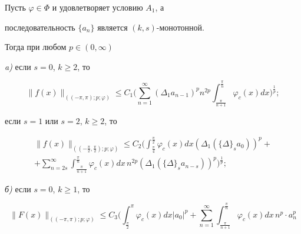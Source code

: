 \begin{assrt}


Пусть $\varphi\in\Phi$ и удовлетворяет условию $A_1$, а


последовательность $\{a_n\}$ является $(k,s)$-монотонной.


Тогда при любом $p\in (0,\infty)$





{\em a)} если $s=0$, $k\geq 2$, то


\begin{equation}


\| f(x)\|_{((-\pi,\pi);p;\varphi)}\leq


C_1\bigg(\sum\limits_{n=1}^{\infty}(\Delta_1a_{n-1})^p n^{2p}


\int_{\frac{\pi}{n+1}}^{\frac{\pi}{n}} \varphi_c(x) dx\bigg)^{\frac{1}{p}};


\end{equation}





если $s=1$ или $s=2$, $k\geq 2$, то


\begin{multline}


\| f(x)\|_{((-\frac{\pi}{2},\frac{\pi}{2});p;\varphi)}\leq


C_2\bigg(\int_{\frac{\pi}{4}}^{\frac{\pi}{2}} \varphi_c(x) dx


(\Delta_1(\{\Delta\}_sa_0))^p+ \\ +


\sum\limits_{n=2s}^{\infty}


\int_{\frac{\pi}{n+1}}^{\frac{\pi}{n}} \varphi_c(x) dx\, n^{2p}


(\Delta_1(\{\Delta\}_sa_{n-s}))^p \bigg)^{\frac{1}{p}};


\end{multline}





{\em б)} если $s=0$, $k\geq 1$, то


\begin{equation}


\| F(x)\|_{((-\pi,\pi);p;\varphi)}\leq


C_3\bigg(\int_{\frac{\pi}{2}}^{\pi} \varphi_c(x) dx


|a_0|^p+\sum\limits_{n=1}^{\infty}


\int_{\frac{\pi}{n+1}}^{\frac{\pi}{n}} \varphi_c(x) dx\, n^p\cdot a_n^p



\end{equation}
\end{assrt}

